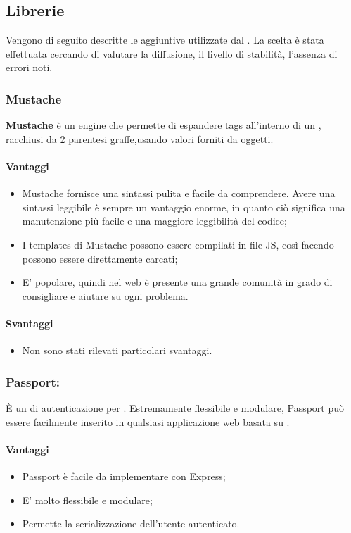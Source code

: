 \subsection{Librerie}
Vengono di seguito descritte le  aggiuntive utilizzate dal . La scelta è stata effettuata cercando di valutare la diffusione, il livello di stabilità, l'assenza di errori noti.

	\subsubsection{Mustache}
\textbf{Mustache} è un  engine che permette di espandere tags all'interno di un , racchiusi da 2 parentesi graffe,usando valori forniti da oggetti.
	\paragraph{Vantaggi}
	\begin{itemize}
	\item Mustache fornisce una sintassi pulita e facile da comprendere. Avere una sintassi leggibile è sempre un vantaggio enorme, in quanto ciò significa una manutenzione più facile e una maggiore leggibilità del codice;
	\item I templates di Mustache possono essere compilati in file JS, così facendo possono essere direttamente carcati;
	\item E' popolare, quindi nel web è presente una grande comunità in grado di consigliare e aiutare su ogni problema.
	\end{itemize}
	
	\paragraph{Svantaggi}
	\begin{itemize}
	\item Non sono stati rilevati particolari svantaggi.
	\end{itemize}

	\subsubsection{Passport:} \label{passport} È un  di autenticazione per . Estremamente flessibile e modulare, Passport può essere facilmente inserito in qualsiasi applicazione web basata su .
	\paragraph{Vantaggi}
	\begin{itemize}
	\item Passport è facile da implementare con Express;
	\item E' molto flessibile e modulare;
	\item Permette la serializzazione dell'utente autenticato.
	\end{itemize}
	
